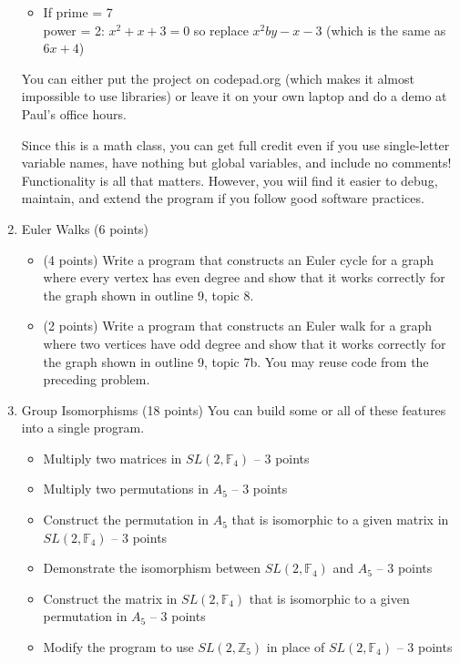\documentclass[12pt]{article}
\begin{document}
\begin{enumerate}
\begin{itemize}
\item If prime = 7\\

power = 2:   $x^2 + x + 3 = 0$    so replace $x^2 by -x -3$ (which is the same as $6x + 4$) 
\end{itemize}

You can either put the project on codepad.org (which makes it almost impossible to use libraries) or leave it on your own laptop and do a demo at Paul's office hours.

Since this is a math class, you can get full credit even if you use single-letter variable names, have nothing but global variables, and include no comments! Functionality is all that matters. However, you wiil find it easier to debug, maintain, and extend the program if you follow good software practices.

\item Euler Walks (6 points)
\begin{itemize}
\item  (4 points) Write a program that constructs an Euler cycle for a graph where every vertex has even degree and show that it works correctly for the graph shown in outline 9, topic 8.

\item (2 points) Write a program that constructs an Euler walk for a graph where two vertices have odd degree and show that it works correctly for the graph shown in outline 9, topic 7b. You may reuse code from the preceding problem.
\end{itemize}


\item Group Isomorphisms (18 points)
You can build some or all of these features into a single program.  
\begin{itemize}
\item Multiply two matrices in $SL(2,\mathbb{F}_4)$  -- 3 points
\item Multiply two permutations in $A_5$ -- 3 points
\item Construct the permutation in  $A_5$ that is isomorphic to a given matrix in $SL(2,\mathbb{F}_4)$ -- 3 points
\item Demonstrate the isomorphism between $SL(2,\mathbb{F}_4)$ and $A_5$ -- 3 points
\item Construct the  matrix in $SL(2,\mathbb{F}_4)$ that is isomorphic to a given permutation in  $A_5$ -- 3 points
\item Modify the program to use $SL(2,\mathbb{Z}_5)$ in place of $SL(2,\mathbb{F}_4)$ -- 3 points
\end{itemize}


\end{enumerate}
\end{document}
